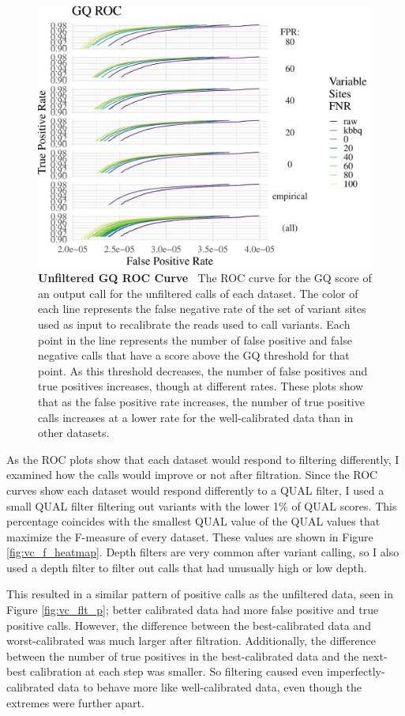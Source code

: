 \documentclass{report}
\newcommand{\titlecaption}[2]{\caption[#1]{\textbf{#1 \textbar\,} #2}}
\begin{document}
\begin{figure}
\centering
\includegraphics[width=.7\textwidth]{gqroc.pdf}
\titlecaption{Unfiltered GQ ROC Curve}{The ROC curve for the GQ score of an output call for the unfiltered calls of each dataset. The color of each line represents the false negative rate of the set of variant sites used as input to recalibrate the reads used to call variants. Each point in the line represents the number of false positive and false negative calls that have a score above the GQ threshold for that point. As this threshold decreases, the number of false positives and true positives increases, though at different rates. These plots show that as the false positive rate increases, the number of true positive calls increases at a lower rate for the well-calibrated data than in other datasets.}
\label{fig:vc_qualroc}
\end{figure}

\begin{outline}
\item As the ROC plots show that each dataset would respond to filtering differently, I examined how the calls would improve or not after filtration. Since the ROC curves show each dataset would respond differently to a QUAL filter, I used a small QUAL filter filtering out variants with the lower 1\% of QUAL scores. This percentage coincides with the smallest QUAL value of the QUAL values that maximize the F-measure of every dataset. These values are shown in Figure \ref{fig:vc_f_heatmap}. Depth filters are very common after variant calling, so I also used a depth filter to filter out calls that had unusually high or low depth.
\item This resulted in a similar pattern of positive calls as the unfiltered data, seen in Figure \ref{fig:vc_flt_p}; better calibrated data had more false positive and true positive calls. However, the difference between the best-calibrated data and worst-calibrated was much larger after filtration. Additionally, the difference between the number of true positives in the best-calibrated data and the next-best calibration at each step was smaller. So filtering caused even imperfectly-calibrated data to behave more like well-calibrated data, even though the extremes were further apart.
\end{outline}
\end{document}
